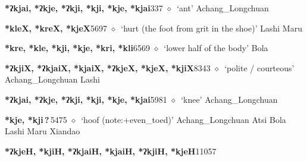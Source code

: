 \begin{list}{}{\leftmargin=1.5em \itemindent=-1.5em}
  \item {\footnotesize \textbf{*ʔkjai, *ʔkje, *ʔkji, *kji, *kje, *kjai}}{\tiny 337}
\hspace{1ex}
         $\diamond$~`ant'
         Achang\_Longchuan 
  \item {\footnotesize \textbf{*kleX, *kreX, *kjeX}}{\tiny 5697}
\hspace{1ex}
         $\diamond$~`hurt (the foot from grit in the shoe)'
         Lashi 
\hspace{1ex}
         Maru 
  \item {\footnotesize \textbf{*kre, *kle, *kji, *kje, *kri, *kli}}{\tiny 6569}
\hspace{1ex}
         $\diamond$~`lower half of the body'
         Bola 
  \item {\footnotesize \textbf{*ʔkjiX, *ʔkjaiX, *kjaiX, *ʔkjeX, *kjeX, *kjiX}}{\tiny 8343}
\hspace{1ex}
         $\diamond$~`polite / courteous'
         Achang\_Longchuan 
\hspace{1ex}
         Lashi 
  \item {\footnotesize \textbf{*ʔkjai, *ʔkje, *ʔkji, *kji, *kje, *kjai}}{\tiny 5981}
\hspace{1ex}
         $\diamond$~`knee'
         Achang\_Longchuan 
  \item {\footnotesize \textbf{*kje, *kji\,?\,}}{\tiny 5475}
\hspace{1ex}
         $\diamond$~`hoof (note:+even_toed)'
         Achang\_Longchuan 
\hspace{1ex}
         Atsi 
\hspace{1ex}
         Bola 
\hspace{1ex}
         Lashi 
\hspace{1ex}
         Maru 
\hspace{1ex}
         Xiandao 
  \item {\footnotesize \textbf{*ʔkjeH, *kjiH, *ʔkjaiH, *kjaiH, *ʔkjiH, *kjeH}}{\tiny 11057}

\end{list}
